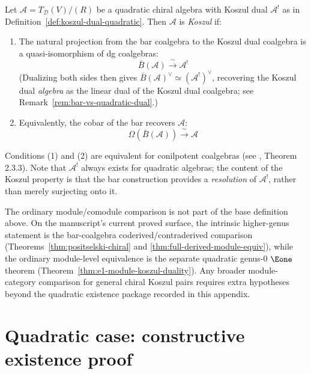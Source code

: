 \begin{definition}\label{def:koszul-property-existence}
Let $\mathcal{A} = T_{\mathcal{D}}(V)/(R)$ be a quadratic chiral algebra with
Koszul dual $\mathcal{A}^!$ as in Definition~\ref{def:koszul-dual-quadratic}.
Then $\mathcal{A}$ is \emph{Koszul} if:
\begin{enumerate}
\item The natural projection from the bar coalgebra to the Koszul dual
      coalgebra is a quasi-isomorphism of dg coalgebras:
      \[\bar{B}(\mathcal{A}) \xrightarrow{\;\sim\;} \mathcal{A}^!\]
      (Dualizing both sides then gives
      $\bar{B}(\mathcal{A})^{\vee} \simeq (\mathcal{A}^!)^{\vee}$,
      recovering the Koszul dual \emph{algebra} as the linear dual of
      the Koszul dual coalgebra; see
      Remark~\ref{rem:bar-vs-quadratic-dual}.)
\item Equivalently, the cobar of the bar recovers $\mathcal{A}$:
      \[\Omega(\bar{B}(\mathcal{A})) \xrightarrow{\;\sim\;} \mathcal{A}\]
\end{enumerate}
Conditions (1) and (2) are equivalent for conilpotent coalgebras
(see \cite{LV12}, Theorem 2.3.3).  Note that $\mathcal{A}^!$ always exists for
quadratic algebras; the content of the Koszul property is that the bar
construction provides a \emph{resolution} of $\mathcal{A}^!$, rather than merely
surjecting onto it.
\end{definition}

\begin{remark}
\label{rem:existence-module-comparison-extra}
The ordinary module/comodule comparison is not part of the base
definition above.  On the manuscript's current proved surface, the
intrinsic higher-genus statement is the bar-coalgebra
coderived/contraderived comparison
\textup{(}Theorems~\ref{thm:positselski-chiral} and
\ref{thm:full-derived-module-equiv}\textup{)}, while the ordinary
module-level equivalence is the separate quadratic genus-$0$
$\Eone$ theorem
\textup{(}Theorem~\ref{thm:e1-module-koszul-duality}\textup{)}.
Any broader module-category comparison for general chiral Koszul pairs
requires extra hypotheses beyond the quadratic existence package
recorded in this appendix.
\end{remark}


\section{Quadratic case: constructive existence proof}
\label{sec:quadratic-existence}

